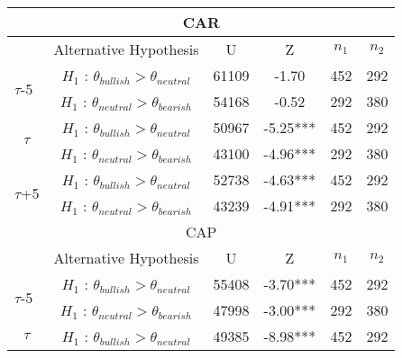 \begin{table}[]
\centering
\begin{tabular}{|c|c|c|c|c|c|}
\hline
\multicolumn{6}{|c|}{CAR}                                                                                                                                    \\ \hline 
\multicolumn{1}{|l|}{}                     & Alternative Hypothesis                                                         & U     & Z        & $n_1$ & $n_2$ \\ \hline
\multicolumn{1}{|l|}{\multirow{2}{*}{$\tau$-5}} & $H_1$ : $\theta_{bullish} > \theta_{neutral}$ & 61109 & -1.70    & 452  & 292  \\
\multicolumn{1}{|l|}{}                     & $H_1$ : $\theta_{neutral} > \theta_{bearish}$  & 54168 & -0.52    & 292  & 380  \\ \hline
\multirow{2}{*}{$\tau$}                         & $H_1$ : $\theta_{bullish} > \theta_{neutral}$ & 50967 & -5.25*** & 452  & 292  \\
                                           & $H_1$ : $\theta_{neutral} > \theta_{bearish}$  & 43100 & -4.96*** & 292  & 380  \\ \hline
\multirow{2}{*}{$\tau$+5}                       & $H_1$ : $\theta_{bullish} > \theta_{neutral}$ & 52738 & -4.63*** & 452  & 292  \\
                                           & $H_1$ : $\theta_{neutral} > \theta_{bearish}$  & 43239 & -4.91*** & 292  & 380  \\ \hline \hline
\multicolumn{6}{|c|}{CAP}                                                                                                                                    \\ \hline
\multicolumn{1}{|l|}{}                     & Alternative Hypothesis                                                         & U     & Z        & $n_1$ & $n_2$ \\ \hline
\multicolumn{1}{|l|}{\multirow{2}{*}{$\tau$-5}} & $H_1$ : $\theta_{bullish} > \theta_{neutral}$ & 55408 & -3.70*** & 452  & 292  \\
\multicolumn{1}{|l|}{}                     & $H_1$ : $\theta_{neutral} > \theta_{bearish}$  & 47998 & -3.00***   & 292  & 380  \\ \hline
\multirow{2}{*}{$\tau$}                         & $H_1$ : $\theta_{bullish} > \theta_{neutral}$ & 49385 & -8.98*** & 452  & 292  \\

\end{tabular}
\end{table}
